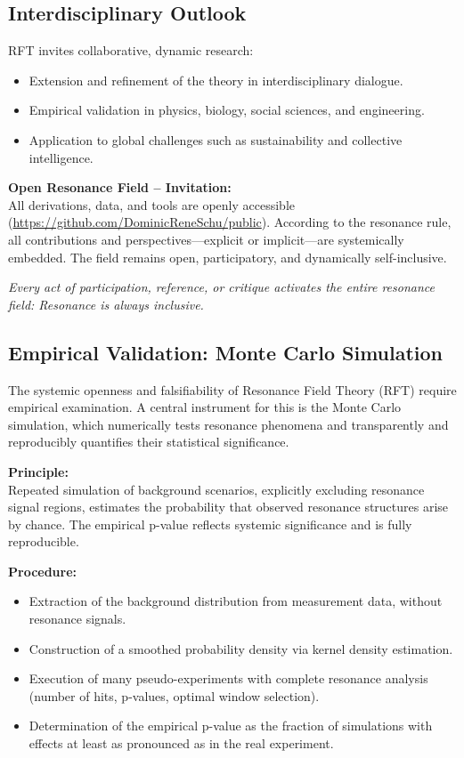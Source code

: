 \documentclass[12pt]{iopart}
\begin{document}
\subsection{Interdisciplinary Outlook}

RFT invites collaborative, dynamic research:
\begin{itemize}
	\item Extension and refinement of the theory in interdisciplinary dialogue.
	\item Empirical validation in physics, biology, social sciences, and engineering.
	\item Application to global challenges such as sustainability and collective intelligence.
\end{itemize}

\medskip

\newpage

\noindent\textbf{Open Resonance Field – Invitation:}\\
All derivations, data, and tools are openly accessible (\url{https://github.com/DominicReneSchu/public}). According to the resonance rule, all contributions and perspectives—explicit or implicit—are systemically embedded. The field remains open, participatory, and dynamically self-inclusive.

\medskip

\noindent\textit{Every act of participation, reference, or critique activates the entire resonance field: Resonance is always inclusive.}

\subsection{Empirical Validation: Monte Carlo Simulation}
\label{sec:monte_carlo}

The systemic openness and falsifiability of Resonance Field Theory (RFT) require empirical examination. A central instrument for this is the Monte Carlo simulation, which numerically tests resonance phenomena and transparently and reproducibly quantifies their statistical significance.

\textbf{Principle:}\\
Repeated simulation of background scenarios, explicitly excluding resonance signal regions, estimates the probability that observed resonance structures arise by chance. The empirical p-value reflects systemic significance and is fully reproducible.

\textbf{Procedure:}
\begin{itemize}
	\item Extraction of the background distribution from measurement data, without resonance signals.
	\item Construction of a smoothed probability density via kernel density estimation.
	\item Execution of many pseudo-experiments with complete resonance analysis (number of hits, p-values, optimal window selection).
	\item Determination of the empirical p-value as the fraction of simulations with effects at least as pronounced as in the real experiment.
\end{itemize}
\end{document}
